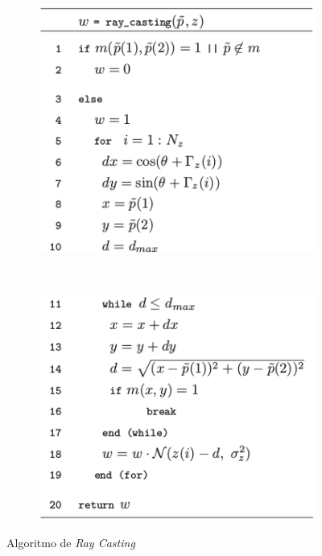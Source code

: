 \documentclass[
	12pt,				%
	openright,			%
	oneside,			%
	a4paper,			%
	english,			%
	french,				%
	spanish,			%
	brazil,				%
	]{abntex2}
\begin{document}
\begin{figure}[h!]
    \centering
    \begin{subfigure}[b]{0.4\textwidth}
        \includegraphics[width=\textwidth]{figs/raycast_alg_1}
        \caption{}
        \label{fig:raycast_alg_1}
    \end{subfigure}
    ~ %
    \begin{subfigure}[b]{0.4\textwidth}
        \includegraphics[width=\textwidth]{figs/raycast_alg_2}
        \caption{}
        \label{fig:raycast_alg_2}
    \end{subfigure}
    \caption{Algoritmo de \emph{Ray Casting}}
    \label{fig:raycast_alg}
\end{figure}
\end{document}
